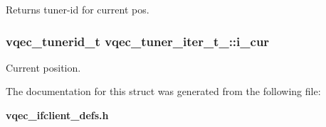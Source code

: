 Returns tuner-id for current pos. 

\subsubsection{\setlength{\rightskip}{0pt plus 5cm}vqec\_\-tunerid\_\-t \bf{vqec\_\-tuner\_\-iter\_\-t\_\-::i\_\-cur}}\label{structvqec__tuner__iter__t___405c1203520e71161f9f7cc9ac4afea3}


Current position. 



The documentation for this struct was generated from the following file:\begin{CompactItemize}
\item 
\bf{vqec\_\-ifclient\_\-defs.h}\end{CompactItemize}
